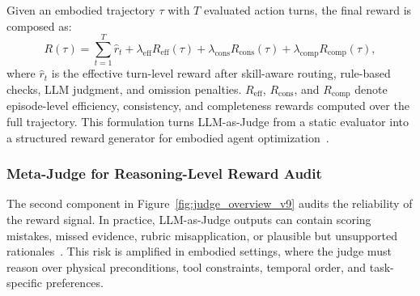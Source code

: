 Given an embodied trajectory $\tau$ with $T$ evaluated action turns, the final reward is composed as:
\begin{equation}
R(\tau)=
\sum_{t=1}^{T}\hat{r}_{t}
+ \lambda_{\mathrm{eff}} R_{\mathrm{eff}}(\tau)
+ \lambda_{\mathrm{cons}} R_{\mathrm{cons}}(\tau)
+ \lambda_{\mathrm{comp}} R_{\mathrm{comp}}(\tau),
\label{eq:multi_tier_reward}
\end{equation}
where $\hat{r}_{t}$ is the effective turn-level reward after skill-aware routing, rule-based checks, LLM judgment, and omission penalties. $R_{\mathrm{eff}}$, $R_{\mathrm{cons}}$, and $R_{\mathrm{comp}}$ denote episode-level efficiency, consistency, and completeness rewards computed over the full trajectory. This formulation turns LLM-as-Judge from a static evaluator into a structured reward generator for embodied agent optimization~\citep{zheng2023judging}.

\subsubsection{Meta-Judge for Reasoning-Level Reward Audit}
\label{subsec:meta_judge_audit}

The second component in Figure~\ref{fig:judge_overview_v9} audits the reliability of the reward signal. In practice, LLM-as-Judge outputs can contain scoring mistakes, missed evidence, rubric misapplication, or plausible but unsupported rationales~\citep{silva2026metajudging}. This risk is amplified in embodied settings, where the judge must reason over physical preconditions, tool constraints, temporal order, and task-specific preferences.

